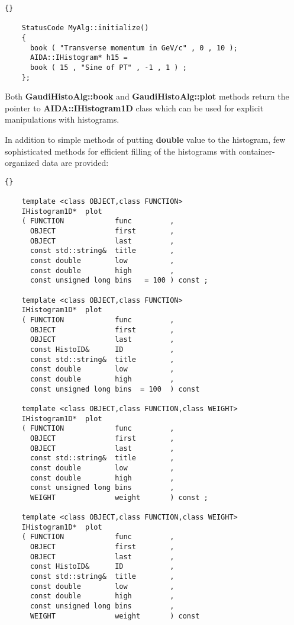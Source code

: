 \documentclass{lhcbnote}
\newcommand{\bftt}         {\ttfamily\bfseries}
\begin{document}
\begin{scriptsize}
 \begin{lstlisting}{}

    StatusCode MyAlg::initialize()
    {
      book ( "Transverse momentum in GeV/c" , 0 , 10 );
      AIDA::IHistogram* h15 =
      book ( 15 , "Sine of PT" , -1 , 1 ) ;
    };

 \end{lstlisting}
\end{scriptsize}

Both {\bftt{GaudiHistoAlg::book}}
and {\bftt{GaudiHistoAlg::plot}} methods return
the pointer to  {\bftt{ AIDA::IHistogram1D}}
class which can be used for explicit manipulations
with histograms.

In addition to simple methods of putting {\bftt{double}}
value to the histogram, few sophisticated methods for
efficient filling of the  histograms with container-organized data are
provided:

\begin{scriptsize}
  \begin{lstlisting}{}

    template <class OBJECT,class FUNCTION>
    IHistogram1D*  plot
    ( FUNCTION            func         ,
      OBJECT              first        ,
      OBJECT              last         ,
      const std::string&  title        ,
      const double        low          ,
      const double        high         ,
      const unsigned long bins   = 100 ) const ;

    template <class OBJECT,class FUNCTION>
    IHistogram1D*  plot
    ( FUNCTION            func         ,
      OBJECT              first        ,
      OBJECT              last         ,
      const HistoID&      ID           ,
      const std::string&  title        ,
      const double        low          ,
      const double        high         ,
      const unsigned long bins  = 100  ) const

    template <class OBJECT,class FUNCTION,class WEIGHT>
    IHistogram1D*  plot
    ( FUNCTION            func         ,
      OBJECT              first        ,
      OBJECT              last         ,
      const std::string&  title        ,
      const double        low          ,
      const double        high         ,
      const unsigned long bins         ,
      WEIGHT              weight       ) const ;

    template <class OBJECT,class FUNCTION,class WEIGHT>
    IHistogram1D*  plot
    ( FUNCTION            func         ,
      OBJECT              first        ,
      OBJECT              last         ,
      const HistoID&      ID           ,
      const std::string&  title        ,
      const double        low          ,
      const double        high         ,
      const unsigned long bins         ,
      WEIGHT              weight       ) const

 \end{lstlisting}
\end{scriptsize}
\end{document}
